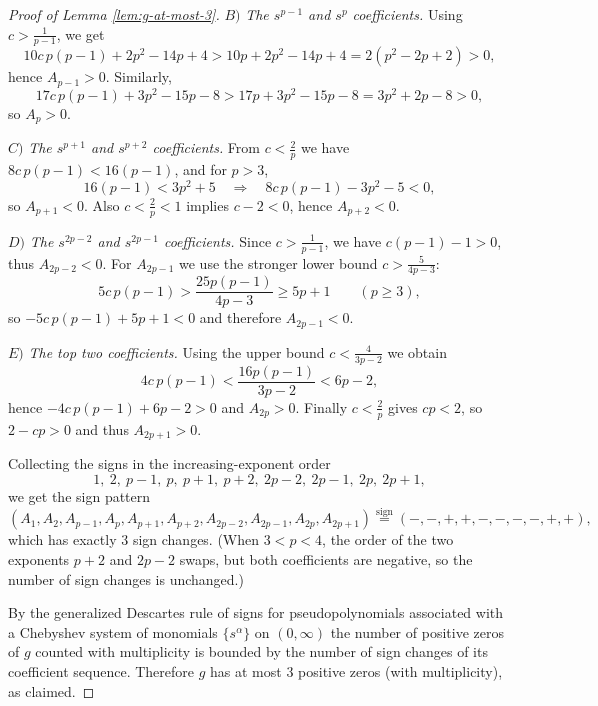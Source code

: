 \documentclass[11pt]{article}
\theoremstyle{definition}
\newcommand{\1}{\mathbf{1}}
\begin{document}
\begin{proof}[Proof of Lemma \ref{lem:g-at-most-3}]
\smallskip
\noindent$B)$ \emph{The $s^{p-1}$ and $s^{p}$ coefficients.}
Using $c>\frac{1}{p-1}$, we get
\[
10c\,p(p-1)+2p^{2}-14p+4 > 10p+2p^{2}-14p+4 = 2(p^{2}-2p+2)>0,
\]
hence $A_{p-1}>0$. Similarly,
\[
17c\,p(p-1)+3p^{2}-15p-8 > 17p+3p^{2}-15p-8 = 3p^{2}+2p-8>0,
\]
so $A_{p}>0$.

\smallskip
\noindent$C)$ \emph{The $s^{p+1}$ and $s^{p+2}$ coefficients.}
From $c<\frac{2}{p}$ we have $8c\,p(p-1)<16(p-1)$, and for $p>3$,
\[
16(p-1) < 3p^{2}+5
\quad\Longrightarrow\quad
8c\,p(p-1)-3p^{2}-5<0,
\]
so $A_{p+1}<0$. Also $c<\frac{2}{p}<1$ implies $c-2<0$, hence $A_{p+2}<0$.

\smallskip
\noindent$D)$ \emph{The $s^{2p-2}$ and $s^{2p-1}$ coefficients.}
Since $c>\frac{1}{p-1}$, we have $c(p-1)-1>0$, thus $A_{2p-2}<0$.
For $A_{2p-1}$ we use the stronger lower bound $c>\frac{5}{4p-3}$:
\[
5c\,p(p-1)>\frac{25p(p-1)}{4p-3}\ge 5p+1
\qquad (p\ge 3),
\]
so $-5c\,p(p-1)+5p+1<0$ and therefore $A_{2p-1}<0$.

\smallskip
\noindent$E)$ \emph{The top two coefficients.}
Using the upper bound $c<\frac{4}{3p-2}$ we obtain
\[
4c\,p(p-1) < \frac{16p(p-1)}{3p-2} < 6p-2,
\]
hence $-4c\,p(p-1)+6p-2>0$ and $A_{2p}>0$.
Finally $c<\frac{2}{p}$ gives $cp<2$, so $2-cp>0$ and thus $A_{2p+1}>0$.

\smallskip
Collecting the signs in the increasing-exponent order
\[
1,\ 2,\ p-1,\ p,\ p+1,\ p+2,\ 2p-2,\ 2p-1,\ 2p,\ 2p+1,
\]
we get the sign pattern
\[
(A_{1},A_{2},A_{p-1},A_{p},A_{p+1},A_{p+2},A_{2p-2},A_{2p-1},A_{2p},A_{2p+1})
\stackrel{\mathrm{sign}}{=}
(-,-,+,+,-,-,-,-,+,+),
\]
which has exactly $3$ sign changes. (When $3<p<4$, the order of the two exponents
$p+2$ and $2p-2$ swaps, but both coefficients are negative, so the number of sign
changes is unchanged.)

By the generalized Descartes rule of signs for pseudopolynomials associated with a
Chebyshev system of monomials $\{s^{\alpha}\}$ on $(0,\infty)$ the number of positive
zeros of $g$ counted with multiplicity is bounded by the number of sign changes of
its coefficient sequence. Therefore $g$ has at most $3$ positive zeros (with multiplicity),
as claimed.

\vskip1cm 


\end{proof}

\end{document}
